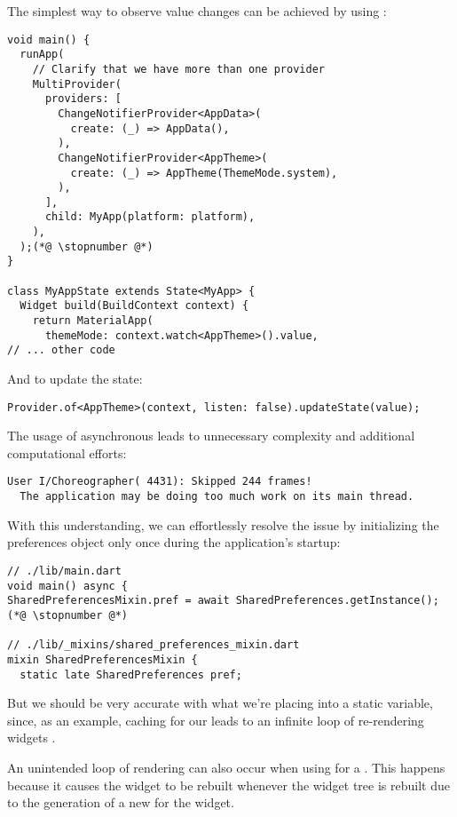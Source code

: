 \noindent The simplest way to observe value changes can be achieved by using :

\begin{lstlisting}
void main() {
  runApp(
    // Clarify that we have more than one provider
    MultiProvider(
      providers: [
        ChangeNotifierProvider<AppData>(
          create: (_) => AppData(),
        ),
        ChangeNotifierProvider<AppTheme>(
          create: (_) => AppTheme(ThemeMode.system),
        ),
      ],
      child: MyApp(platform: platform),
    ),
  );(*@ \stopnumber @*)
}

class MyAppState extends State<MyApp> {
  Widget build(BuildContext context) {
    return MaterialApp(
      themeMode: context.watch<AppTheme>().value,
// ... other code
\end{lstlisting}

\noindent And to update the state:

\begin{lstlisting}
Provider.of<AppTheme>(context, listen: false).updateState(value);
\end{lstlisting}

\noindent The usage of asynchronous  leads to unnecessary complexity and additional computational efforts:

\begin{lstlisting}[language=terminal]
User I/Choreographer( 4431): Skipped 244 frames!
  The application may be doing too much work on its main thread.
\end{lstlisting}

\noindent With this understanding, we can effortlessly resolve the issue by initializing the preferences object only 
once during the application's startup:

\begin{lstlisting}
// ./lib/main.dart
void main() async {
SharedPreferencesMixin.pref = await SharedPreferences.getInstance();(*@ \stopnumber @*)

// ./lib/_mixins/shared_preferences_mixin.dart
mixin SharedPreferencesMixin {
  static late SharedPreferences pref;
\end{lstlisting}

\noindent But we should be very accurate with what we're placing into a static variable, since, as an example, 
caching  for our  leads to an infinite loop of re-rendering widgets .

An unintended loop of rendering can also occur when using  for a . This happens 
because it causes the widget to be rebuilt whenever the widget tree is rebuilt due to the generation of a new 
 for the widget.
